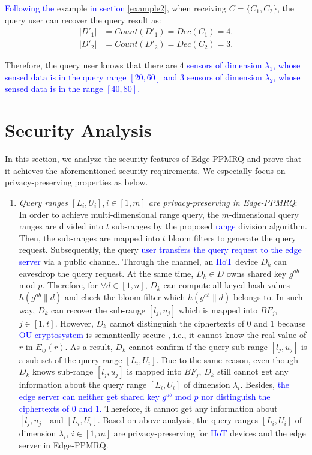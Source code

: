 \documentclass[IEEE JOURNAL OF BIOMEDICAL AND HEALTH INFORMATICS]{IEEEtran}
\begin{document}
{\textcolor{blue}{Following the} example \textcolor{blue}{in section \ref{example2}}, when receiving $C=\{C_1, C_2\}$, the query user can recover the query result as:
 \begin{align*}
 |D'_1| &= Count(D'_1) = Dec(C_1)=4. \\
 |D'_2| &= Count(D'_2) = Dec(C_2)=3.
 \end{align*}

 Therefore, the query user knows that there are $4$ \textcolor{blue}{sensors of dimension $\lambda_1$, whose sensed data is in the query range $[20, 60]$ and $3$ sensors of dimension $\lambda_2$, whose sensed data is in the range $[40, 80]$.}

\section{Security Analysis}
In this section, we analyze the security features of Edge-PPMRQ and prove that it achieves the aforementioned security requirements. We especially focus on privacy-preserving properties as below.

\begin{enumerate}
	\item \emph{Query ranges $[L_i, U_i], i\in [1, m]$ are privacy-preserving in Edge-PPMRQ}:
	In order to achieve multi-dimensional range query, the $m$-dimensional query ranges are divided into $t$ sub-ranges by the proposed \textcolor{blue}{range} division algorithm. Then, the sub-ranges are mapped into $t$ bloom filters to generate the query request. Subsequently, the query \textcolor{blue}{user transfers the query request to the edge server} via a public channel. Through the channel, an \textcolor{blue}{IIoT} device $D_k$ can eavesdrop the query request. At the same time, $D_k \in D$ owns shared key $g^{ab}$ mod $p$. Therefore, for $\forall d \in [1, n]$, $D_k$ can compute all keyed hash values $h(g^{ab} \| d)$ and check the bloom filter which $h(g^{ab} \| d)$ belongs to. In such way, $D_k$ can recover the sub-range $[l_j, u_j]$ which is mapped into $BF_j$, $j\in[1, t]$. However, $D_k$ cannot distinguish the ciphertexts of $0$ and $1$ because \textcolor{blue}{OU cryptosystem} is semantically secure \cite{ou1998}, i.e., it cannot know the real value of $r$ in $E_{ij}(r)$. As a result, $D_k$ cannot confirm if the query sub-range $[l_j, u_j]$ is a sub-set of the query range $[L_i, U_i]$. Due to the same reason, even though $D_k$ knows sub-range $[l_j, u_j]$ is mapped into $BF_j$, $D_k$ still cannot get any information about the query range $[L_i, U_i]$ of dimension $\lambda_i$. Besides, \textcolor{blue}{the edge server can neither get shared key $g^{ab}$ mod $p$ nor distinguish the ciphertexts of $0$ and $1$.} Therefore, it cannot get any information about $[l_j, u_j]$ and $[L_i, U_i]$. Based on above analysis, the query ranges $[L_i, U_i]$ of dimension $\lambda_i$, $i \in [1, m]$ are privacy-preserving for \textcolor{blue}{IIoT} devices and the edge server in Edge-PPMRQ.
	

\end{enumerate}}
\end{document}
